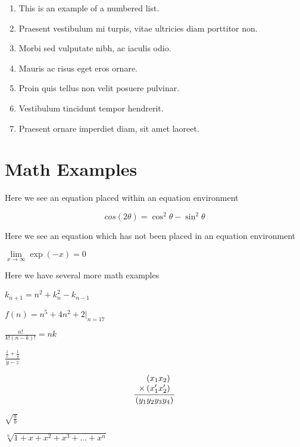 \begin{enumerate}
\item This is an example of a numbered list.
\item Praesent vestibulum mi turpis, vitae ultricies diam porttitor non.
\item Morbi sed vulputate nibh, ac iaculis odio.
\item Mauris ac risus eget eros ornare.
\item Proin quis tellus non velit posuere pulvinar.
\item Vestibulum tincidunt tempor hendrerit.
\item Praesent ornare imperdiet diam, sit amet laoreet.
\end{enumerate}


\section{Math Examples}



Here we see an equation placed within an equation environment\par
\begin{equation}
cos (2\theta) = {\cos^2}\theta - \sin^2 \theta
\end{equation}

Here we see an equation which has not been placed in an equation environment\par
$
\lim\limits_{x \to \infty} \exp(-x) = 0
$

Here we have several more math examples\par
$
k_{n+1} = n^2 + k_n^2 - k_{n-1}
$

$
f(n) = n^5 + 4n^2 + 2 |_{n=17}
$

$
\frac{n!}{k!(n-k)!} = {n}{k}
$

$\frac{\frac{1}{x}+\frac{1}{y}}{y-z}$

\begin{equation}
\frac{
    \begin{array}[b]{r}
      \left( x_1 x_2 \right)\\
      \times \left( x'_1 x'_2 \right)
    \end{array}
  }{
    \left( y_1y_2y_3y_4 \right)
  }
\end{equation}

$\sqrt{\frac{a}{b}}$

$\sqrt[n]{1+x+x^2+x^3+\dots+x^n}$

